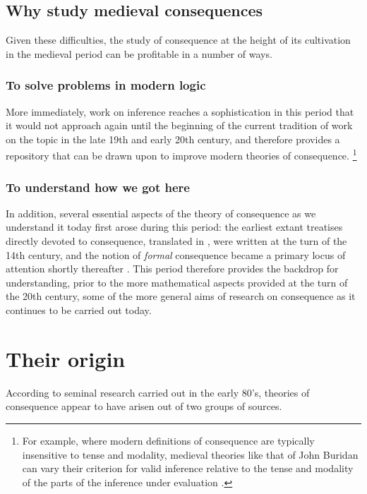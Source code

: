 \documentclass[]{article}
\begin{document}
\subsection{Why study medieval consequences}
Given these difficulties, 
the study of consequence at the height of its cultivation in the medieval period can be profitable in a number of ways. 

\subsubsection{To solve problems in modern logic}
More immediately, 
work on inference reaches a sophistication in this period that it would not approach again until the beginning of the current tradition of work on the topic in the late 19th and early 20th century, 
and therefore provides a repository that can be drawn upon to improve modern theories of consequence.
\footnote{For example, 
where modern definitions of consequence are typically insensitive to tense and modality, 
medieval theories like that of John Buridan can vary their criterion for valid inference relative to the tense and modality of the parts of the inference under evaluation \autocite{BuridanTC}.}

\subsubsection{To understand how we got here}
In addition, 
several essential aspects of the theory of consequence as we understand it today first arose during this period: 
the earliest extant treatises directly devoted to consequence, 
translated in \autocite{Archambault2017d}, 
were written at the turn of the 14th century, 
and the notion of \emph{formal} consequence became a primary locus of attention shortly thereafter \autocite{sep-consequence-medieval}. 
This period therefore provides the backdrop for understanding, 
prior to the more mathematical aspects provided at the turn of the 20th century, 
some of the more general aims of research on consequence as it continues to be carried out today. 

\section{Their origin}
According to seminal research carried out in the early 80's,
theories of consequence appear to have arisen out of two groups of sources. 
\end{document}
